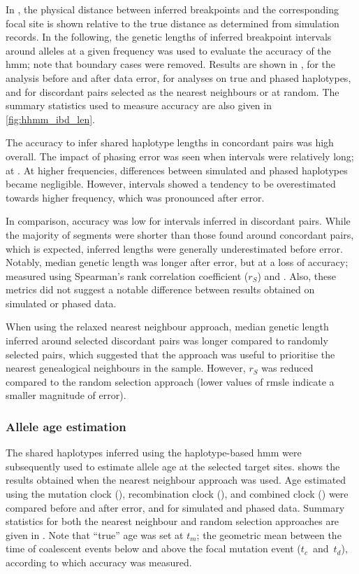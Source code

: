 In , the physical distance between inferred breakpoints and the corresponding focal site is shown relative to the true distance as determined from simulation records.
In the following, the genetic lengths of inferred breakpoint intervals around alleles at a given frequency was used to evaluate the accuracy of the \gls{hmm}; note that boundary cases were removed.
Results are shown in , for the analysis before and after data error, for analyses on true and phased haplotypes, and for discordant pairs selected as the nearest neighbours or at random.
The summary statistics used to measure accuracy are also given in \cref{fig:hhmm_ibd_len}.


%

%

The accuracy to infer shared haplotype lengths in concordant pairs was high overall.
The impact of phasing error was seen when intervals were relatively long; \eg at .
At higher frequencies, differences between simulated and phased haplotypes became negligible.
However, intervals showed a tendency to be overestimated towards higher frequency, which was pronounced after error.

In comparison, accuracy was low for intervals inferred in discordant pairs.
While the majority of segments were shorter than those found around concordant pairs, which is expected, inferred lengths were generally underestimated before error.
Notably, median genetic length was longer after error, but at a loss of accuracy; \eg measured using Spearman's rank correlation coefficient ($r_S$) and .
Also, these metrics did not suggest a notable difference between results obtained on simulated or phased data.

When using the relaxed nearest neighbour approach, median genetic length inferred around selected discordant pairs was longer compared to randomly selected pairs, which suggested that the approach was useful to prioritise the nearest genealogical neighbours in the sample.
However, $r_S$ was reduced compared to the random selection approach (lower values of \gls{rmsle} indicate a smaller magnitude of error).



%
\subsubsection{Allele age estimation}
%

The shared haplotypes inferred using the haplotype-based \gls{hmm} were subsequently used to estimate allele age at the selected target sites.
 shows the results obtained when the nearest neighbour approach was used.
Age estimated using the mutation clock (\ClockM), recombination clock (\ClockR), and combined clock (\ClockC) were compared before and after error, and for simulated and phased data.
Summary statistics for both the nearest neighbour and random selection approaches are given in .
Note that ``true'' age was set at $t_m$; \ie the geometric mean between the time of coalescent events below and above the focal mutation event ($t_c$~and~$t_d$), according to which accuracy was measured.

